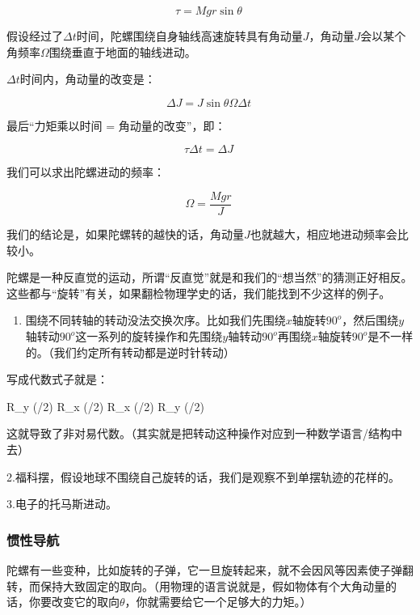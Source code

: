 \begin{equation}
\tau = Mg r \sin \theta~
\end{equation}

假设经过了$\Delta t$时间，陀螺围绕自身轴线高速旋转具有角动量$J$，角动量$J$会以某个角频率$\Omega$围绕垂直于地面的轴线进动。

$\Delta t$时间内，角动量的改变是：

\begin{equation}
\Delta J = J \sin \theta \Omega \Delta t~
\end{equation}

最后“力矩乘以时间 = 角动量的改变”，即：

\begin{equation}
\tau \Delta t = \Delta J~
\end{equation}

我们可以求出陀螺进动的频率：

\begin{equation}
\Omega = \frac{Mg r}{J}~
\end{equation}

我们的结论是，如果陀螺转的越快的话，角动量$J$也就越大，相应地进动频率会比较小。

陀螺是一种反直觉的运动，所谓“反直觉”就是和我们的“想当然”的猜测正好相反。这些都与“旋转”有关，如果翻检物理学史的话，我们能找到不少这样的例子。

\begin{enumerate}
\item 

围绕不同转轴的转动没法交换次序。比如我们先围绕$x$轴旋转$90^o$，然后围绕$y$轴转动$90^o$这一系列的旋转操作和先围绕$y$轴转动$90^o$再围绕$x$轴旋转$90^o$是不一样的。（我们约定所有转动都是逆时针转动）
\end{enumerate}

写成代数式子就是：


R_y (\pi /2)  R_x (\pi/2)  \neq  R_x (\pi/2)  R_y (\pi /2)~

这就导致了非对易代数。（其实就是把转动这种操作对应到一种数学语言/结构中去）

2.福科摆，假设地球不围绕自己旋转的话，我们是观察不到单摆轨迹的花样的。

3.电子的托马斯进动。

\subsubsection{惯性导航}

陀螺有一些变种，比如旋转的子弹，它一旦旋转起来，就不会因风等因素使子弹翻转，而保持大致固定的取向。（用物理的语言说就是，假如物体有个大角动量的话，你要改变它的取向$\theta$，你就需要给它一个足够大的力矩。）

